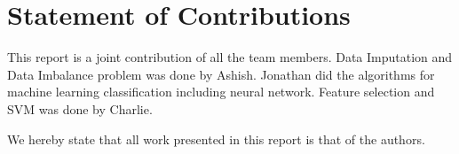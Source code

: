 \documentclass[conference]{IEEEtran}
\begin{document}
\appendices
\section{Statement of Contributions}
This report is a joint contribution of all the team members. Data Imputation and Data Imbalance problem was done by Ashish. Jonathan did the algorithms for machine learning classification including neural network. Feature selection and SVM was done by Charlie.

We hereby state that all work presented in this report is that of the authors.


%
%
%

\printbibliography

\end{document}
